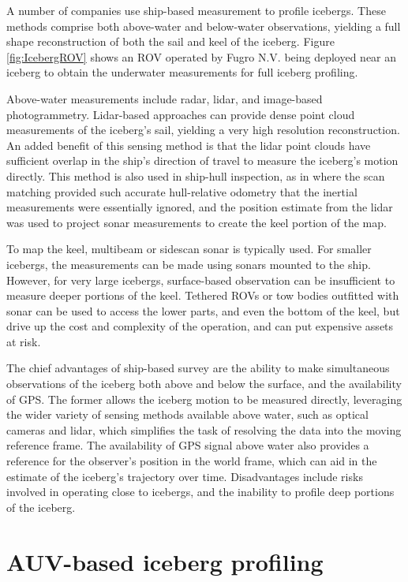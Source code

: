 A number of companies use ship-based measurement to profile icebergs. These methods comprise both above-water and below-water observations, yielding a full shape reconstruction of both the sail and keel of the iceberg. Figure \ref{fig:IcebergROV} shows an ROV operated by Fugro N.V. being deployed near an iceberg to obtain the underwater measurements for full iceberg profiling.

Above-water measurements include radar, lidar, and image-based photogrammetry. Lidar-based approaches can provide dense point cloud measurements of the iceberg's sail, yielding a very high resolution reconstruction. An added benefit of this sensing method is that the lidar point clouds have sufficient overlap in the ship's direction of travel to measure the iceberg's motion directly. This method is also used in ship-hull inspection, as in \cite{Papadopoulos2014} where the scan matching provided such accurate hull-relative odometry that the inertial measurements were essentially ignored, and the position estimate from the lidar was used to project sonar measurements to create the keel portion of the map.

To map the keel, multibeam or sidescan sonar is typically used. For smaller icebergs, the measurements can be made using sonars mounted to the ship. However, for very large icebergs, surface-based observation can be insufficient to measure deeper portions of the keel. Tethered ROVs or tow bodies outfitted with sonar can be used to access the lower parts, and even the bottom of the keel, but drive up the cost and complexity of the operation, and can put expensive assets at risk. 

The chief advantages of ship-based survey are the ability to make simultaneous observations of the iceberg both above and below the surface, and the availability of GPS. The former allows the iceberg motion to be measured directly, leveraging the wider variety of sensing methods available above water, such as optical cameras and lidar, which simplifies the task of resolving the data into the moving reference frame. The availability of GPS signal above water also provides a reference for the observer's position in the world frame, which can aid in the estimate of the iceberg's trajectory over time. Disadvantages include risks involved in operating close to icebergs, and the inability to profile deep portions of the iceberg. 

\section{AUV-based iceberg profiling}

